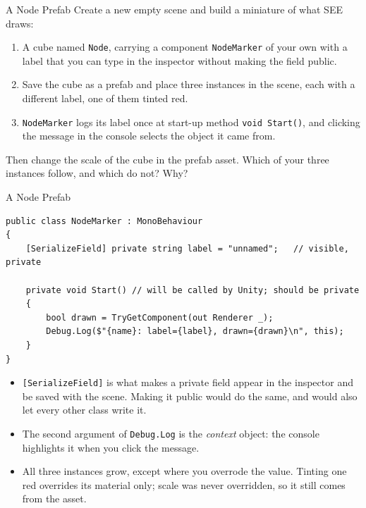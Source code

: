 \begin{exerciseframe}{A Node Prefab}
  Create a new empty scene and build a miniature of what SEE draws:
  \vspace{1ex}

  \begin{enumerate}
    \item A cube named \texttt{Node}, carrying a component
      \texttt{NodeMarker} of your own with a label that you can type in the
      inspector without making the field public.
    \item Save the cube as a prefab and place three instances in the scene,
      each with a different label, one of them tinted red.
    \item \texttt{NodeMarker} logs its label once at start-up method \texttt{void Start()},
    and clicking the message in the console selects the object it came from.
  \end{enumerate}
  \vspace{1ex}

  Then change the scale of the cube in the prefab asset. Which of your three
  instances follow, and which do not? Why?
\end{exerciseframe}

\begin{solutionframe}{A Node Prefab}
  \begin{lstlisting}[basicstyle=\scriptsize\ttfamily]
public class NodeMarker : MonoBehaviour
{
    [SerializeField] private string label = "unnamed";   // visible, private

    private void Start() // will be called by Unity; should be private
    {
        bool drawn = TryGetComponent(out Renderer _);
        Debug.Log($"{name}: label={label}, drawn={drawn}\n", this);
    }
}
  \end{lstlisting}
  \vspace{1ex}

  \begin{itemize}
    \item \texttt{[SerializeField]} is what makes a private field appear in
      the inspector and be saved with the scene. Making it public would do
      the same, and would also let every other class write it.
    \item The second argument of \texttt{Debug.Log} is the \emph{context}
      object: the console highlights it when you click the message.
    \item All three instances grow, except where you overrode the value.
      Tinting one red overrides its material only; scale was never overridden,
      so it still comes from the asset.
  \end{itemize}
\end{solutionframe}


